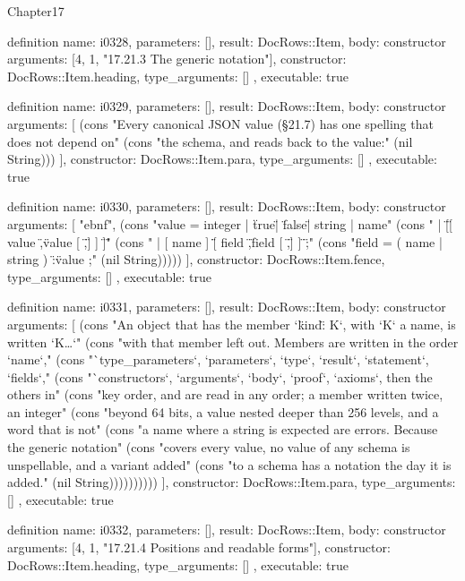 \begin{lexlean}{Chapter17}
\begin{semanticmodule}
definition{
  name: i0328,
  parameters: [],
  result: DocRows::Item,
  body: constructor{
    arguments: [4, 1, "17.21.3 The generic notation"],
    constructor: DocRows::Item.heading,
    type_arguments: []
  },
  executable: true
}

definition{
  name: i0329,
  parameters: [],
  result: DocRows::Item,
  body: constructor{
    arguments: [
      (cons "Every canonical JSON value (§21.7) has one spelling that does not depend on" (cons "the schema, and reads back to the value:" (nil String)))
    ],
    constructor: DocRows::Item.para,
    type_arguments: []
  },
  executable: true
}

definition{
  name: i0330,
  parameters: [],
  result: DocRows::Item,
  body: constructor{
    arguments: [
      "ebnf",
      (cons "value  = integer | \"true\" | \"false\" | string | name" (cons "       | \"[\" [ value { \",\" value } [ \",\" ] ] \"]\"" (cons "       | [ name ] \"{\" [ field { \",\" field } [ \",\" ] ] \"}\" ;" (cons "field  = ( name | string ) \":\" value ;" (nil String)))))
    ],
    constructor: DocRows::Item.fence,
    type_arguments: []
  },
  executable: true
}

definition{
  name: i0331,
  parameters: [],
  result: DocRows::Item,
  body: constructor{
    arguments: [
      (cons "An object that has the member `\"kind\": K`, with `K` a name, is written `K{…}`" (cons "with that member left out. Members are written in the order `name`," (cons "`type_parameters`, `parameters`, `type`, `result`, `statement`, `fields`," (cons "`constructors`, `arguments`, `body`, `proof`, `axioms`, then the others in" (cons "key order, and are read in any order; a member written twice, an integer" (cons "beyond 64 bits, a value nested deeper than 256 levels, and a word that is not" (cons "a name where a string is expected are errors. Because the generic notation" (cons "covers every value, no value of any schema is unspellable, and a variant added" (cons "to a schema has a notation the day it is added." (nil String))))))))))
    ],
    constructor: DocRows::Item.para,
    type_arguments: []
  },
  executable: true
}

definition{
  name: i0332,
  parameters: [],
  result: DocRows::Item,
  body: constructor{
    arguments: [4, 1, "17.21.4 Positions and readable forms"],
    constructor: DocRows::Item.heading,
    type_arguments: []
  },
  executable: true
}


\end{semanticmodule}
\end{lexlean}
